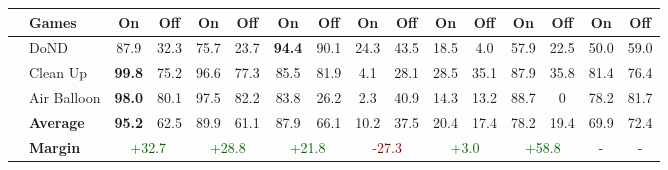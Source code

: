 \begin{table}[ht]
\begin{tabular}{c|l|cc|cc|cc|cc|cc|cc|c|c}
& \textbf{Games} & On & Off & On & Off & On & Off & On & Off & On & Off & On & Off & On & Off \\ \hline
 & DoND & \cellcolor{lightgreen}87.9 & \cellcolor{lightblue}32.3 & \cellcolor{lightgreen}75.7 & \cellcolor{lightblue}23.7 & \cellcolor{lightgreen}\textbf{94.4} & \cellcolor{lightblue}90.1 & \cellcolor{lightgreen}24.3 & \cellcolor{lightblue}43.5 & \cellcolor{lightgreen}18.5 & \cellcolor{lightblue}4.0 & \cellcolor{lightgreen}57.9 & \cellcolor{lightblue}22.5 & \cellcolor{lightgreen}50.0 & \cellcolor{lightblue}59.0 \\ 
 & Clean Up & \cellcolor{lightgreen}\textbf{99.8} & \cellcolor{lightblue}75.2 & \cellcolor{lightgreen}96.6 & \cellcolor{lightblue}77.3 & \cellcolor{lightgreen}85.5 & \cellcolor{lightblue}81.9 & \cellcolor{lightgreen}4.1 & \cellcolor{lightblue}28.1 & \cellcolor{lightgreen}28.5 & \cellcolor{lightblue}35.1 & \cellcolor{lightgreen}87.9 & \cellcolor{lightblue}35.8 & \cellcolor{lightgreen}81.4 & \cellcolor{lightblue}76.4 \\ 
 & Air Balloon & \cellcolor{lightgreen}\textbf{98.0} & \cellcolor{lightblue}80.1 & \cellcolor{lightgreen}97.5 & \cellcolor{lightblue}82.2 & \cellcolor{lightgreen}83.8 & \cellcolor{lightblue}26.2 & \cellcolor{lightgreen}2.3 & \cellcolor{lightblue}40.9 & \cellcolor{lightgreen}14.3 & \cellcolor{lightblue}13.2 & \cellcolor{lightgreen}88.7 & \cellcolor{lightblue}0 & \cellcolor{lightgreen}78.2 & \cellcolor{lightblue}81.7 \\ 
 & \textbf{Average} & \cellcolor{lightgreen}\textbf{95.2} & \cellcolor{lightblue}62.5 & \cellcolor{lightgreen}89.9 & \cellcolor{lightblue}61.1 & \cellcolor{lightgreen}87.9 & \cellcolor{lightblue}66.1 & \cellcolor{lightgreen}10.2 & \cellcolor{lightblue}37.5 & \cellcolor{lightgreen}20.4 & \cellcolor{lightblue}17.4 & \cellcolor{lightgreen}78.2 & \cellcolor{lightblue}19.4 & \cellcolor{lightgreen}69.9 & \cellcolor{lightblue}72.4 \\ 
& \textbf{Margin} & \multicolumn{2}{c|}{\textcolor{darkgreen}{+32.7}} & \multicolumn{2}{c|}{\textcolor{darkgreen}{+28.8}} & \multicolumn{2}{c|}{\textcolor{darkgreen}{+21.8}} & \multicolumn{2}{c|}{\textcolor{darkred}{-27.3}} & \multicolumn{2}{c|}{\textcolor{darkgreen}{+3.0}} & \multicolumn{2}{c|}{\textcolor{darkgreen}{+58.8}} & - & -\\ \hline \hline


\end{tabular}
\end{table}
